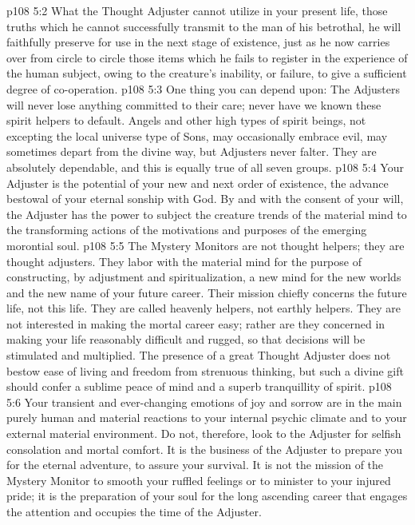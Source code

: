 \vs p108 5:2 What the Thought Adjuster cannot utilize in your present life, those truths which he cannot successfully transmit to the man of his betrothal, he will faithfully preserve for use in the next stage of existence, just as he now carries over from circle to circle those items which he fails to register in the experience of the human subject, owing to the creature’s inability, or failure, to give a sufficient degree of co\hyp{}operation.
\vs p108 5:3 One thing you can depend upon: The Adjusters will never lose anything committed to their care; never have we known these spirit helpers to default. Angels and other high types of spirit beings, not excepting the local universe type of Sons, may occasionally embrace evil, may sometimes depart from the divine way, but Adjusters never falter. They are absolutely dependable, and this is equally true of all seven groups.
\pc \vs p108 5:4 Your Adjuster is the potential of your new and next order of existence, the advance bestowal of your eternal sonship with God. By and with the consent of your will, the Adjuster has the power to subject the creature trends of the material mind to the transforming actions of the motivations and purposes of the emerging morontial soul.
\vs p108 5:5 The Mystery Monitors are not thought helpers; they are thought adjusters. They labor with the material mind for the purpose of constructing, by adjustment and spiritualization, a new mind for the new worlds and the new name of your future career. Their mission chiefly concerns the future life, not this life. They are called heavenly helpers, not earthly helpers. They are not interested in making the mortal career easy; rather are they concerned in making your life reasonably difficult and rugged, so that decisions will be stimulated and multiplied. The presence of a great Thought Adjuster does not bestow ease of living and freedom from strenuous thinking, but such a divine gift should confer a sublime peace of mind and a superb tranquillity of spirit.
\vs p108 5:6 Your transient and ever\hyp{}changing emotions of joy and sorrow are in the main purely human and material reactions to your internal psychic climate and to your external material environment. Do not, therefore, look to the Adjuster for selfish consolation and mortal comfort. It is the business of the Adjuster to prepare you for the eternal adventure, to assure your survival. It is not the mission of the Mystery Monitor to smooth your ruffled feelings or to minister to your injured pride; it is the preparation of your soul for the long ascending career that engages the attention and occupies the time of the Adjuster.\plusone
